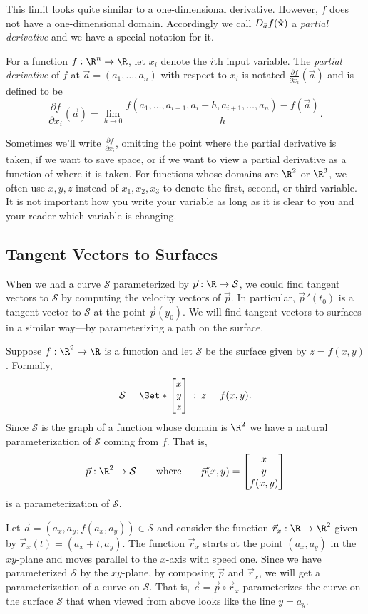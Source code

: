 This limit looks quite similar to a one-dimensional derivative.  However, $f$ does not
have a one-dimensional domain.  Accordingly we call $D_{\vec a}f({\hat {\mathbf x}})$ a 
\emph{partial derivative} and we have a special notation for it.

\begin{definition}
	For a function $f:\R^n\to\R$, let $x_i$ denote the $i$th input variable.
	The \emph{partial derivative} of $f$ at $\vec a=(a_1,\ldots,a_n)$ with respect to $x_i$ is 
	notated $\frac{\partial f}{\partial x_i}(\vec a)$ and is defined to be
	\[
		\frac{\partial f}{\partial x_i}(\vec a) = 
		\lim_{h\to0}\frac{f(a_1,\ldots,a_{i-1},a_i+h,a_{i+1},\ldots,a_n)-f(\vec a)}{h}.
	\]
\end{definition}
Sometimes we'll write $\frac{\partial f}{\partial x_i}$, omitting the point where the partial
derivative is taken, if we want to save space, or if we want to view a partial derivative as a function
of where it is taken.  For functions whose domains are $\R^2$ or $\R^3$, we often use $x,y,z$ 
instead of $x_1,x_2,x_3$ to denote
the first, second, or third variable.  It is not important how you write your variable as long
as it is clear to you and your reader which variable is changing.

\subsection{Tangent Vectors to Surfaces}
When we had a curve $\mathcal S$ parameterized by $\vec p:\R\to\mathcal S$,
we could find tangent vectors to $\mathcal S$ by computing the velocity vectors of $\vec p$.
In particular, $\vec p\,'(t_0)$ is a tangent vector to $\mathcal S$ at the point $\vec p(y_0)$.
We will find tangent vectors to surfaces in a similar way---by parameterizing a path on the surface.

Suppose $f:\R^2\to \R$ is a function and let $\mathcal S$ be the surface given by $z=f(x,y)$.  Formally,
\[
	\mathcal S=\Set*{\matc{x\\y\\z}\given z=f(x,y)}.
\]
Since $\mathcal S$ is the graph of a function whose domain is $\R^2$ we have a natural parameterization
of $\mathcal S$ coming from $f$.  That is,
\[
	\vec p:\R^2\to\mathcal S\qquad\text{where}\qquad \vec p(x,y)=\matc{x\\y\\f(x,y)}
\]
is a parameterization of $\mathcal S$.

Let $\vec a=(a_x,a_y,f(a_x,a_y))\in\mathcal S$ and consider the function $\vec r_x:\R\to\R^2$
given by $\vec r_x(t) = (a_x+t,a_y)$.  The function $\vec r_x$ starts at the point $(a_x,a_y)$
in the $xy$-plane and moves parallel to the $x$-axis with speed one.  Since we have parameterized
$\mathcal S$ by the $xy$-plane, by composing $\vec p$ and $\vec r_x$, we will get a parameterization
of a curve on $\mathcal S$.  That is, $\vec c=\vec p\circ \vec r_x$ parameterizes the curve
on the surface $\mathcal S$ that when viewed from above looks like the line $y=a_y$.


